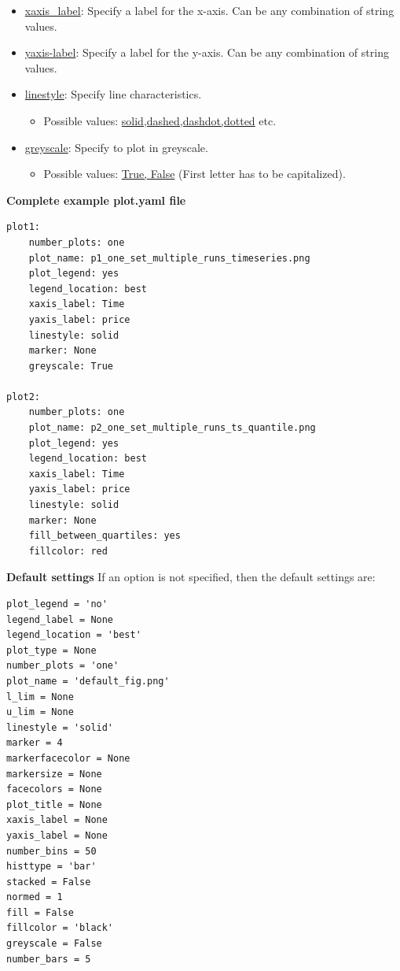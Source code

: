 \documentclass[10pt,a4paper]{article}
\begin{document}
\begin{itemize}
\item \url{xaxis_label}: Specify a label for the x-axis. Can be any combination of string values.

\item \url{yaxis-label}: Specify a label for the y-axis. Can be any combination of string values.

\item \url{linestyle}: Specify line characteristics. 

\begin{itemize}
\item Possible values: \url{solid,dashed,dashdot,dotted} etc.
\end{itemize}

\item \url{greyscale}: Specify to plot in greyscale.

\begin{itemize}
\item Possible values: \url{True, False} (First letter has to be capitalized).
\end{itemize}
\end{itemize}

\bigskip
\textbf{Complete example plot.yaml file}

\begin{lstlisting}
plot1:
    number_plots: one
    plot_name: p1_one_set_multiple_runs_timeseries.png
    plot_legend: yes
    legend_location: best
    xaxis_label: Time
    yaxis_label: price
    linestyle: solid
    marker: None
    greyscale: True

plot2:
    number_plots: one
    plot_name: p2_one_set_multiple_runs_ts_quantile.png
    plot_legend: yes
    legend_location: best
    xaxis_label: Time
    yaxis_label: price
    linestyle: solid
    marker: None
    fill_between_quartiles: yes
    fillcolor: red
\end{lstlisting}


\bigskip
\textbf{Default settings}
If an option is not specified, then the default settings are:

\begin{lstlisting}
plot_legend = 'no'
legend_label = None
legend_location = 'best'
plot_type = None
number_plots = 'one'
plot_name = 'default_fig.png'
l_lim = None
u_lim = None
linestyle = 'solid'
marker = 4
markerfacecolor = None
markersize = None
facecolors = None
plot_title = None
xaxis_label = None
yaxis_label = None
number_bins = 50
histtype = 'bar'
stacked = False
normed = 1
fill = False
fillcolor = 'black'
greyscale = False
number_bars = 5
\end{lstlisting}
\end{document}
